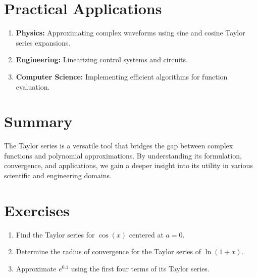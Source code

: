 \documentclass[12pt]{article}
\begin{document}
\section*{Practical Applications}
\begin{enumerate}
    \item \textbf{Physics:} Approximating complex waveforms using sine and cosine Taylor series expansions.
    \item \textbf{Engineering:} Linearizing control systems and circuits.
    \item \textbf{Computer Science:} Implementing efficient algorithms for function evaluation.
\end{enumerate}

\section*{Summary}
The Taylor series is a versatile tool that bridges the gap between complex functions and polynomial approximations. By understanding its formulation, convergence, and applications, we gain a deeper insight into its utility in various scientific and engineering domains.

\section*{Exercises}
\begin{enumerate}
    \item Find the Taylor series for $\cos(x)$ centered at $a=0$.
    \item Determine the radius of convergence for the Taylor series of $\ln(1+x)$.
    \item Approximate $e^{0.1}$ using the first four terms of its Taylor series.
\end{enumerate}
\end{document}
